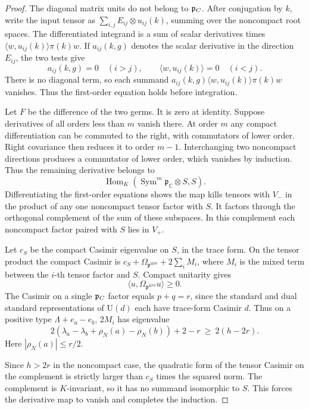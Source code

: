 \begin{proof}
The diagonal matrix units do not belong to \(\mathfrak p_{C}\). After conjugation by \(k\), write the input tensor as \(\sum_{i,j} E_{ij}\otimes u_{ij}(k)\), summing over the noncompact root spaces. The differentiated integrand
is a sum of scalar derivatives times
\(\langle w,u_{ij}(k)\rangle\pi(k)w\).
If \(a_{ij}(k,g)\) denotes the scalar derivative in the direction \(E_{ij}\), the
two tests give
\[
 a_{ij}(k,g)=0\quad(i>j),\qquad
 \langle w,u_{ij}(k)\rangle=0\quad(i<j).
\]
There is no diagonal term, so each summand
\(a_{ij}(k,g)\langle w,u_{ij}(k)\rangle\pi(k)w\) vanishes. Thus the first-order equation holds before integration.

Let \(F\) be the difference of the two germs. It is zero at identity.
Suppose derivatives of all orders less than \(m\) vanish there.
At order \(m\) any compact differentiation can be commuted to the
right, with commutators of lower order. Right covariance then
reduces it to order \(m-1\). Interchanging two noncompact directions produces a commutator of
lower order, which vanishes by induction. Thus the remaining derivative belongs to
\[
 \operatorname{Hom}_K(\operatorname{Sym}^m\mathfrak p_{\mathbb C}
                         \otimes S,S).
\] Differentiating the
first-order equations shows the map kills tensors with \(V_-\)
in the product of any one noncompact tensor factor with \(S\). It factors through
the orthogonal complement of the sum of these subspaces. In this
complement each noncompact factor paired with \(S\) lies in \(V_+\).

Let \(c_S\) be the compact Casimir eigenvalue on \(S\), in the trace
form. On the tensor product the compact Casimir is
\(c_S+\Omega_{\mathfrak p^{\otimes m}}+2\sum_i M_i\), where
\(M_i\) is the mixed term between the \(i\)-th tensor factor and \(S\).
Compact unitarity gives
\[
 \langle u,\Omega_{\mathfrak p^{\otimes m}}u\rangle\ge0 .
\] The Casimir on a single \(\mathfrak p_{C}\)
factor equals \(p+q=r\), since the standard and dual standard
representations of \(\mathrm U(d)\) each have trace-form Casimir
\(d\). Thus on a positive type \(\Lambda+e_a-e_b\), \(2M_i\)
has eigenvalue
\[
  2(\lambda_a-\lambda_b+\rho_N(a)-\rho_N(b))+2-r
                 \ \ge\ 2(h-2r).
\]
Here \(|\rho_N(a)|\le r/2\).

Since \(h>2r\) in the noncompact
case, the quadratic form of the tensor Casimir on the complement
is strictly larger than \(c_S\) times the squared norm. The
complement is \(K\)-invariant, so it has no summand isomorphic to
\(S\). This forces the derivative map to vanish and completes the
induction.


\end{proof}
